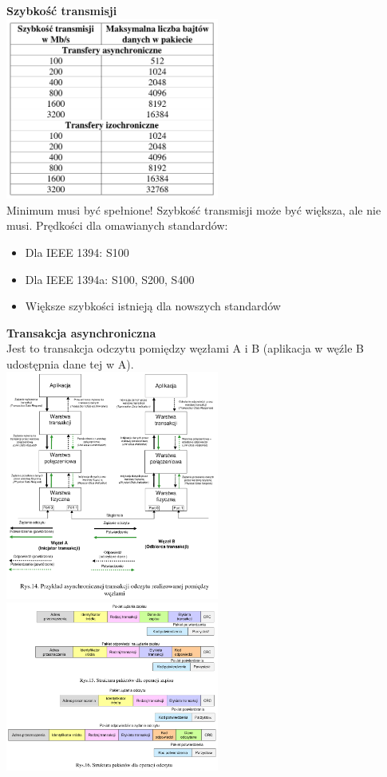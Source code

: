 	\textbf{Szybkość transmisji}\\
	\includegraphics[width=7cm]{./wyklady/FIREWIRE_16_1.pdf}\\
	Minimum musi być spełnione! Szybkość transmisji może być większa, ale nie musi.
	Prędkości dla omawianych standardów:
	\begin{itemize}
		\item Dla IEEE 1394: S100
		\item Dla IEEE 1394a: S100, S200, S400
		\item Większe szybkości istnieją dla nowszych standardów
	\end{itemize}
	\newpage
	\textbf{Transakcja asynchroniczna}\\
	Jest to transakcja odczytu pomiędzy węzłami A i B (aplikacja w węźle B udostępnia dane tej w A).\\
	\includegraphics[width=7cm]{./wyklady/FIREWIRE_17_1.pdf}
	\includegraphics[width=7cm]{./wyklady/FIREWIRE_18_1.pdf}\\\\
